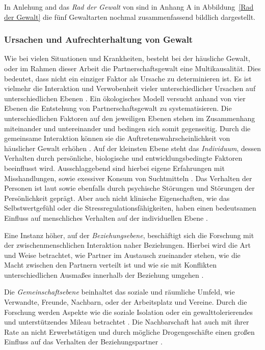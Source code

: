 In Anlehung and das \textit{Rad der Gewalt} von \textcite{Rad_der_Gewalt} sind in Anhang A in Abbildung~\ref{Rad der Gewalt} die fünf Gewaltarten nochmal zusammenfassend bildlich dargestellt. %

\subsubsection{Ursachen und Aufrechterhaltung von Gewalt}     \label{2.1.2.2}
Wie bei vielen Situationen und Krankheiten, besteht bei der häusliche Gewalt, oder im Rahmen dieser Arbeit die Partnerschaftsgewalt eine Multikausalität. Dies bedeutet, dass nicht ein einziger Faktor als Ursache zu determinieren ist. Es ist vielmehr die Interaktion und Verwobenheit vieler unterschiedlicher Ursachen auf unterschiedlichen Ebenen \parencite{Ursache_hG}. Ein ökologisches Modell versucht anhand von vier Ebenen die Entstehung von Partnerschaftsgewalt zu systematisieren. Die unterschiedlichen Faktoren auf den jeweiligen Ebenen stehen im Zusammenhang miteinander und untereinander und bedingen sich somit gegenseitig. Durch die gemeinsame Interaktion können sie die Auftretenswahrscheinlichkeit von häuslicher Gewalt erhöhen \parencite{Ursache_hG_2, Ursache_hG, Gewaltart}.
Auf der kleinsten Ebene steht das \textit{Individuum}, dessen Verhalten durch persönliche, biologische und entwicklungsbedingte Faktoren beeinflusst wird. Ausschlaggebend sind hierbei eigene Erfahrungen mit Misshandlungen, sowie exessiver Konsum von Suchtmitteln \parencite{Ursache_hG_2, Ursache_hG, Gewaltart}. Das Verhalten der Personen ist laut \textcite{Gewaltart} sowie \textcite{Ursache_hG_2} ebenfalls durch psychische Störungen und Störungen der Persönlichkeit geprägt. Aber auch nicht klinische Eigenschaften, wie das Selbstwertgefühl oder die Stressregulationsfähigkeiten, haben einen bedeutsamen Einfluss auf menschliches Verhalten auf der individuellen Ebene \parencite{Ursache_hG}.

Eine Instanz höher, auf der \textit{Beziehungsebene}, beschäftigt sich die Forschung mit der zwischenmenschlichen Interaktion naher Beziehungen. Hierbei wird die Art und Weise betrachtet, wie Partner im Austausch zueinander stehen, wie die Macht zwischen den Partnern verteilt ist und wie sie mit Konflikten unterschiedlichen Ausmaßes innerhalb der Beziehung umgehen \parencite{Ursache_hG_2, Ursache_hG, Gewaltart}.

Die \textit{Gemeinschaftsebene} beinhaltet das soziale und räumliche Umfeld, wie Verwandte, Freunde, Nachbarn, oder der Arbeitsplatz und Vereine. Durch die Forschung werden Aspekte wie die soziale Isolation oder ein gewalttolerierendes und unterstützendes Mileau betrachtet \parencite{Ursache_hG_2, Ursache_hG, Gewaltart}. Die Nachbarschaft hat auch mit ihrer Rate an nicht Erwerbstätigen und durch mögliche Drogengeschäfte einen großen Einfluss auf das Verhalten der Beziehungspartner \parencite{Ursache_hG, Gewaltart}.

